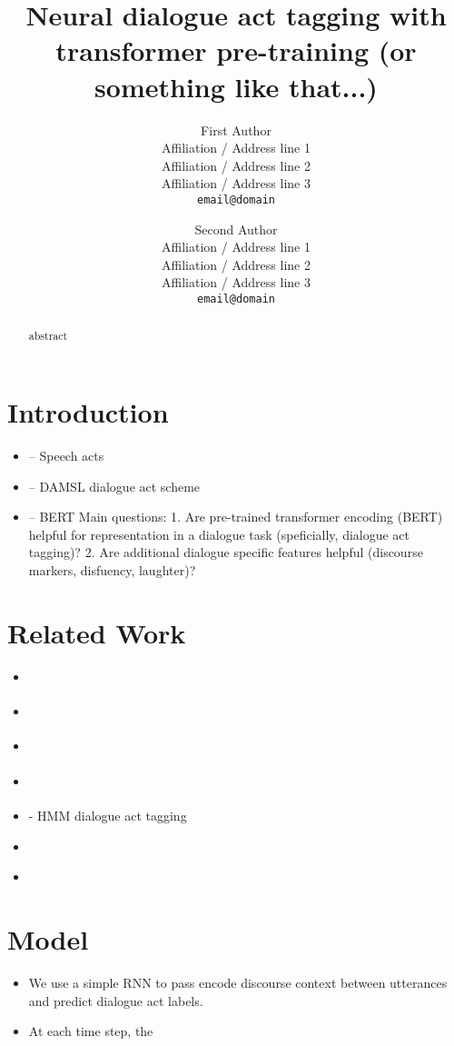 \documentclass[11pt,a4paper]{article}
\title{Neural dialogue act tagging with transformer pre-training (or something like that...)}
\author{
  First Author \\
  Affiliation / Address line 1 \\
  Affiliation / Address line 2 \\
Affiliation / Address line 3 \\
  {\tt email@domain} \\\and
  Second Author \\
  Affiliation / Address line 1 \\
  Affiliation / Address line 2 \\
  Affiliation / Address line 3 \\
  {\tt email@domain} \\
}
\date{}
\begin{document}
\maketitle

\begin{abstract}
  abstract
\end{abstract}

\section{Introduction}
\begin{itemize}
  \item \cite{austinHowThingsWords2009} -- Speech acts
  \item \cite{coreCodingDialogsDAMSL1997} -- DAMSL dialogue act scheme
  \item \cite{devlinBERTPretrainingDeep2018} -- BERT
    Main questions:
    1. Are pre-trained transformer encoding (BERT) helpful for representation in a dialogue task (speficially, dialogue act tagging)?
    2. Are additional dialogue specific features helpful (discourse markers, disfuency, laughter)?
\end{itemize}

\section{Related Work}
\begin{itemize}
  \item \cite{cerisaraEffectsUsingWord2vec2017}
  \item \cite{kalchbrennerRecurrentConvolutionalNeural2013}
  \item \cite{pragstVectorRepresentationUtterances2018}
  \item \cite{sordoniNeuralNetworkApproach2015}
  \item \cite{stolckeDialogueActModeling2000} - HMM dialogue act tagging
  \item \cite{khanpourDialogueActClassification}
  \item \cite{tranPreservingDistributionalInformation2017}
\end{itemize}

\section{Model}
\begin{itemize}
  \item We use a simple RNN to pass encode discourse context between utterances and predict dialogue act labels.
  \item At each time step, the 
\end{itemize}
\end{document}
